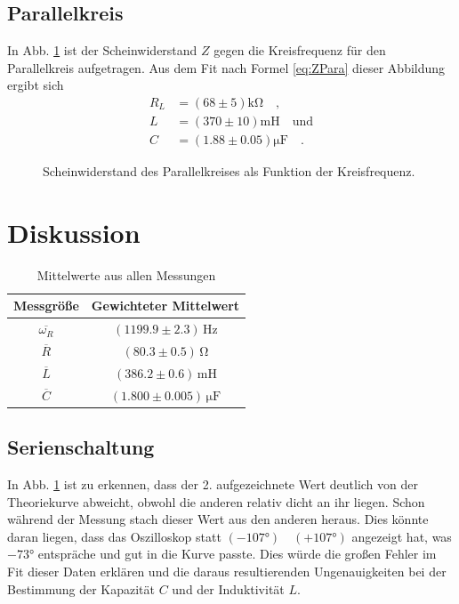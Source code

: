 \documentclass[12pt,a4paper,titlepage,headinclude,bibtotoc]{scrartcl}
\begin{document}
\subsection{Parallelkreis}
In Abb. \ref{fig:messung3} ist der Scheinwiderstand $Z$ gegen die Kreisfrequenz für den Parallelkreis aufgetragen.
Aus dem Fit nach Formel \eqref{eq:ZPara} dieser Abbildung ergibt sich
\begin{align*}
R_L &= (68\pm 5)\si{\kilo\ohm}\quad ,\\
L &= (370 \pm 10)\si{\milli\henry}\quad \text{und}\\
C &= (1.88  \pm 0.05) \si{\micro\farad}\quad .
\end{align*}
\begin{figure}[!htb]
	\centering
	
	\caption{Scheinwiderstand des Parallelkreises als Funktion der Kreisfrequenz.}
	\label{fig:messung3}
\end{figure}

\section{Diskussion}
\label{sec:diskussion}
\renewcommand{\arraystretch}{1.4} 
\begin{table}
\centering
\begin{tabular}{|c|c|}
\hline
Messgröße		&	Gewichteter Mittelwert\\\hline\hline
$\overline{\omega_R}$	&	$(1199.9\pm 2.3)\,\si{\hertz}$\\\hline
$\overline R$		&	$(80.3 \pm 0.5)\,\si{\ohm}$\\\hline
$\overline L$		&	$(386.2 \pm 0.6)\,\si{\milli\henry}$\\\hline
$\overline C$		&	$(1.800 \pm 0.005)\,\si{\micro\farad}$\\\hline
\end{tabular}
\caption{Mittelwerte aus allen Messungen}
\label{tab:mittelwerteserie}
\end{table}

\subsection{Serienschaltung}
In Abb. \ref{fig:messung3} ist zu erkennen, dass der 2. aufgezeichnete Wert deutlich von der Theoriekurve abweicht, obwohl die anderen relativ dicht an ihr liegen.
Schon während der Messung stach dieser Wert aus den anderen heraus.
Dies könnte daran liegen, dass das Oszilloskop statt $(-107\si\degree)\quad (+107\si\degree)$ angezeigt hat, was $-73\si\degree$ entspräche und gut in die Kurve passte.
Dies würde die großen Fehler im Fit dieser Daten erklären und die daraus resultierenden Ungenauigkeiten bei der Bestimmung der Kapazität $C$ und der Induktivität $L$.\\
\end{document}
